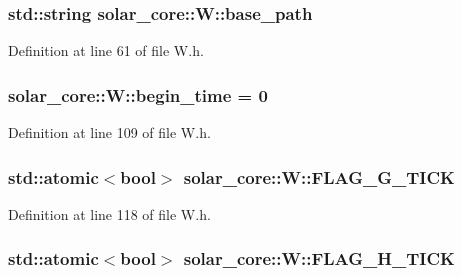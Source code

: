 \subsubsection[{base\+\_\+path}]{\setlength{\rightskip}{0pt plus 5cm}std\+::string solar\+\_\+core\+::\+W\+::base\+\_\+path}\label{classsolar__core_1_1_w_acf6e7dd195573ba04b406cde2e5b80fb}


Definition at line 61 of file W.\+h.

\hypertarget{classsolar__core_1_1_w_aec1b9014ad296dc9b8b132ba9b67c08a}{}
\subsubsection[{begin\+\_\+time}]{ solar\+\_\+core\+::\+W\+::begin\+\_\+time = 0}\label{classsolar__core_1_1_w_aec1b9014ad296dc9b8b132ba9b67c08a}


Definition at line 109 of file W.\+h.

\hypertarget{classsolar__core_1_1_w_aae63ce0d440f2c8d475d6eeafac58238}{}
\subsubsection[{F\+L\+A\+G\+\_\+\+G\+\_\+\+T\+I\+C\+K}]{\setlength{\rightskip}{0pt plus 5cm}std\+::atomic$<$bool$>$ solar\+\_\+core\+::\+W\+::\+F\+L\+A\+G\+\_\+\+G\+\_\+\+T\+I\+C\+K}\label{classsolar__core_1_1_w_aae63ce0d440f2c8d475d6eeafac58238}


Definition at line 118 of file W.\+h.

\hypertarget{classsolar__core_1_1_w_a4cd32940e21bfc20919cc2d4447d66d3}{}
\subsubsection[{F\+L\+A\+G\+\_\+\+H\+\_\+\+T\+I\+C\+K}]{\setlength{\rightskip}{0pt plus 5cm}std\+::atomic$<$bool$>$ solar\+\_\+core\+::\+W\+::\+F\+L\+A\+G\+\_\+\+H\+\_\+\+T\+I\+C\+K}\label{classsolar__core_1_1_w_a4cd32940e21bfc20919cc2d4447d66d3}


